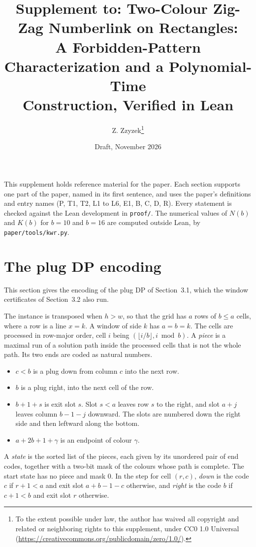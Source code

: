 \documentclass[11pt]{article}
\title{Supplement to: Two-Colour Zig-Zag Numberlink on Rectangles:\\
A Forbidden-Pattern Characterization and a Polynomial-Time\\
Construction, Verified in Lean}
\author{Z. Zzyzek\thanks{To the extent possible under law, the author has waived all copyright and
related or neighboring rights to this supplement, under CC0 1.0 Universal
(\url{https://creativecommons.org/publicdomain/zero/1.0/}).}}
\date{Draft, November 2026}
\newcommand{\lean}[1]{\texttt{#1}}
\begin{document}
\maketitle

This supplement holds reference material for the paper. Each section supports one part of the
paper, named in its first sentence, and uses the paper's definitions and entry names (P, T1, T2,
L1 to L6, E1, B, C, D, R). Every statement is checked against the Lean development in
\lean{proof/}. The numerical values of $N(b)$ and $K(b)$ for $b=10$ and $b=16$ are computed outside
Lean, by \lean{paper/tools/kwr.py}.

\section{The plug DP encoding}\label{sec:plugdp}

This section gives the encoding of the plug DP of Section~3.1, which the window certificates of
Section~3.2 also run.

The instance is transposed when $h>w$, so that the grid has $a$ rows of $b\le a$ cells, where a
row is a line $x=k$. A window of side $k$ has $a=b=k$. The cells are processed in row-major order,
cell $i$ being $(\lfloor i/b\rfloor, i \bmod b)$.
A \emph{piece} is a maximal run of a solution path inside the processed cells that is not the
whole path. Its two ends are coded as natural numbers.

\begin{itemize}
\item $c<b$ is a plug down from column $c$ into the next row.
\item $b$ is a plug right, into the next cell of the row.
\item $b+1+s$ is exit slot $s$. Slot $s<a$ leaves row $s$ to the right, and slot $a+j$ leaves column
  $b-1-j$ downward. The slots are numbered down the right side and then leftward along the
  bottom.
\item $a+2b+1+\gamma$ is an endpoint of colour $\gamma$.
\end{itemize}
A \emph{state} is the sorted list of the pieces, each given by its unordered pair of end codes,
together with a two-bit mask of the colours whose path is complete. The start state has no piece
and mask $0$. In the step for cell $(r,c)$, \emph{down} is the code $c$ if $r+1<a$ and exit slot
$a+b-1-c$ otherwise, and \emph{right} is the code $b$ if $c+1<b$ and exit slot $r$ otherwise.
\end{document}
